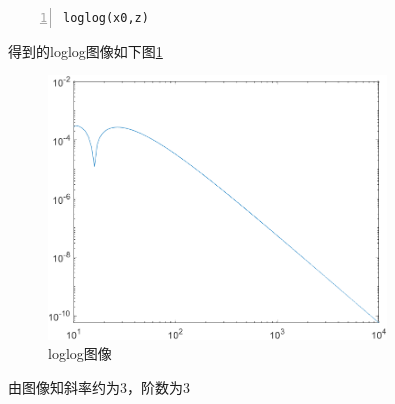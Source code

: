 \documentclass[12pt,a4paper,UTF8]{ctexart}
\begin{document}
\begin{enumerate}
\begin{lstlisting}[frame=single,numbers=left]
loglog(x0,z)
\end{lstlisting}

得到的loglog图像如下图\ref{jpg:5}\\
	\begin{figure}[H]
		\centering
     	\includegraphics[width=0.8\textwidth]{5.png}
    	\caption{loglog图像}\label{jpg:5}
	\end{figure}
由图像知斜率约为3，阶数为3
\end{enumerate}
\end{document}

